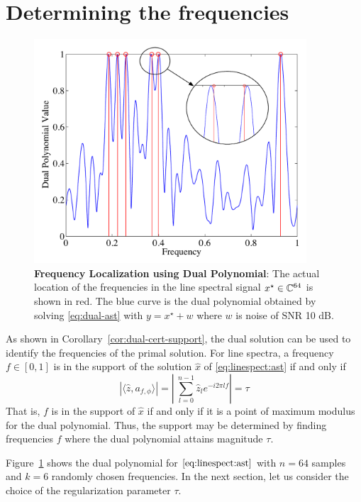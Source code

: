 \section{Determining the frequencies}
\label{sec:frequency-localize}
\begin{figure}[htp]
\centering
\includegraphics[width=4in]{figures/dual_poly_inset.pdf}
\caption{ \textbf{Frequency Localization using Dual Polynomial}: The
actual location of the frequencies in the line spectral signal $x^\star \in
\mathbb{C}^{64}$ is shown in red. The blue curve is the dual polynomial
obtained by solving \eqref{eq:dual-ast} with $y = x^\star + w$ where $w$ is noise of SNR 10 dB.}

\label{fig:dual_poly_localize}
\end{figure}

As shown in Corollary~\ref{cor:dual-cert-support}, the dual solution can be
used to identify the frequencies of the primal solution. For line spectra, a frequency
$f \in [0,1]$ is in the support of the solution $\hat{x}$ of \eqref{eq:linespect:ast} if and
only if
\[
	 |\langle \hat{z}, a_{f,\phi} \rangle| =\left|\ \sum_{l=0}^{n-1} \hat{z}_l e^{-i 2\pi l f} \right| = \tau
\]
That is, $f$ is in the support of $\hat{x}$ if and only if it is a point of
maximum modulus for the dual polynomial. Thus, the support may be determined by
finding frequencies $f$ where the dual polynomial attains magnitude $\tau$.

Figure~\ref{fig:dual_poly_localize} shows the dual polynomial for
$\eqref{eq:linespect:ast}$ with $n = 64$ samples and $k = 6$ randomly chosen
frequencies. In the next section, let us consider the choice of the regularization parameter $\tau$.

